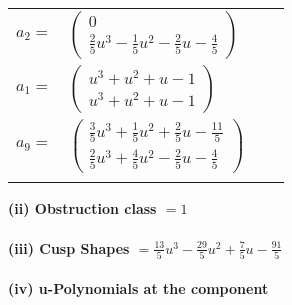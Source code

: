 \documentclass[1p]{elsarticle_modified}
\theoremstyle{definition}
\begin{document}
\begin{tabular}{m{7pt} m{180pt} m{7pt} m{180pt} }
\flushright $a_{2}=$&$\begin{pmatrix}0\\\frac{2}{5} u^3-\frac{1}{5} u^2-\frac{2}{5} u-\frac{4}{5}\end{pmatrix}$ \\
\flushright $a_{1}=$&$\begin{pmatrix}u^3+u^2+u-1\\u^3+u^2+u-1\end{pmatrix}$ \\
\flushright $a_{9}=$&$\begin{pmatrix}\frac{3}{5} u^3+\frac{1}{5} u^2+\frac{2}{5} u-\frac{11}{5}\\\frac{2}{5} u^3+\frac{4}{5} u^2-\frac{2}{5} u-\frac{4}{5}\end{pmatrix}$\\&\end{tabular}
\flushleft \textbf{(ii) Obstruction class $= 1$}\\~\\
\flushleft \textbf{(iii) Cusp Shapes $= \frac{13}{5} u^3-\frac{29}{5} u^2+\frac{7}{5} u-\frac{91}{5}$}\\~\\
\newpage\renewcommand{\arraystretch}{1}
\flushleft \textbf{(iv) u-Polynomials at the component}\newline \\
\end{document}
